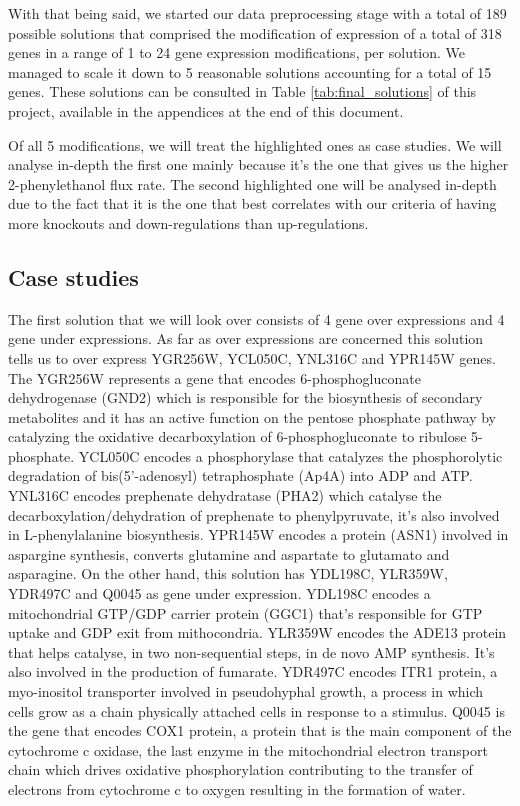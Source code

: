 \documentclass[runningheads]{llncs}
\begin{document}
With that being said, we started our data preprocessing stage with a total of 189 possible solutions that comprised the modification of expression of a total of 318 genes in a range of 1 to 24 gene expression modifications, per solution. We managed to scale it down to 5 reasonable solutions accounting for a total of 15 genes. These solutions can be consulted in Table \ref{tab:final_solutions} of this project, available in the appendices at the end of this document.

Of all 5 modifications, we will treat the highlighted ones as case studies. We will analyse in-depth the first one mainly because it's the one that gives us the higher 2-phenylethanol flux rate. The second highlighted one will be analysed in-depth due to the fact that it is the one that best correlates with our criteria of having more knockouts and down-regulations than up-regulations.

\subsection{Case studies}
The first solution that we will look over consists of 4 gene over expressions and 4 gene under expressions. As far as over expressions are concerned this solution tells us to over express YGR256W, YCL050C, YNL316C and YPR145W genes. The YGR256W represents a gene that encodes 6-phosphogluconate dehydrogenase (GND2) which is responsible for the biosynthesis of secondary metabolites and it has an active function on the pentose phosphate pathway by catalyzing the oxidative decarboxylation of 6-phosphogluconate to ribulose 5-phosphate. YCL050C encodes a phosphorylase that catalyzes the phosphorolytic degradation of bis(5'-adenosyl) tetraphosphate (Ap4A) into ADP and ATP. YNL316C encodes prephenate dehydratase (PHA2) which catalyse the decarboxylation/dehydration of prephenate to phenylpyruvate, it's also involved in L-phenylalanine biosynthesis. YPR145W encodes a protein (ASN1) involved in aspargine synthesis, converts glutamine and aspartate to glutamato and asparagine. On the other hand, this solution has YDL198C, YLR359W, YDR497C and Q0045 as gene under expression. YDL198C encodes a mitochondrial GTP/GDP carrier protein (GGC1) that's responsible for GTP uptake and GDP exit from mithocondria. YLR359W encodes the ADE13 protein that helps catalyse, in two non-sequential steps, in de novo AMP synthesis. It's also involved in the production of fumarate. YDR497C encodes ITR1 protein, a myo-inositol transporter involved in pseudohyphal growth, a process in which cells grow as a chain physically attached cells in response to a stimulus. Q0045 is the gene that encodes COX1 protein, a protein that is the main component of the cytochrome c oxidase, the last enzyme in the mitochondrial electron transport chain which drives oxidative phosphorylation contributing to the transfer of electrons from cytochrome c to oxygen resulting in the formation of water.
\end{document}
